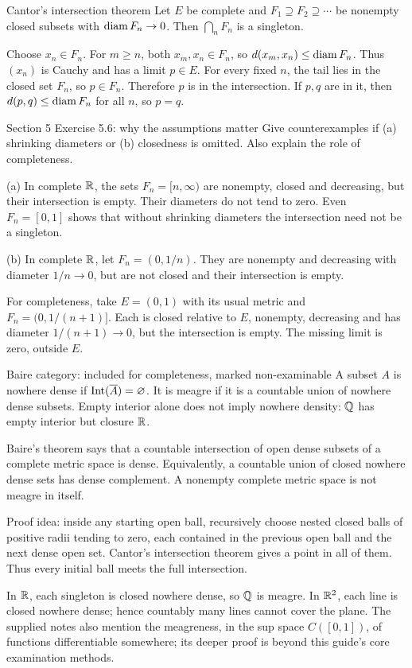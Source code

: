 \begin{note}{Cantor's intersection theorem}
Let $E$ be complete and $F_1\supseteq F_2\supseteq\cdots$ be nonempty closed subsets with $\operatorname{diam} F_n\to0$. Then $\bigcap_nF_n$ is a singleton.

Choose $x_n\in F_n$. For $m\ge n$, both $x_m,x_n\in F_n$, so $d(x_m,x_n)\le\operatorname{diam} F_n$. Thus $(x_n)$ is Cauchy and has a limit $p\in E$. For every fixed $n$, the tail lies in the closed set $F_n$, so $p\in F_n$. Therefore $p$ is in the intersection. If $p,q$ are in it, then $d(p,q)\le\operatorname{diam} F_n$ for all $n$, so $p=q$.
\end{note}
\begin{exam}{Section 5 Exercise 5.6: why the assumptions matter}
Give counterexamples if (a) shrinking diameters or (b) closedness is omitted. Also explain the role of completeness.
\end{exam}
\begin{answer}
(a) In complete $\mathbb R$, the sets $F_n=[n,\infty)$ are nonempty, closed and decreasing, but their intersection is empty. Their diameters do not tend to zero. Even $F_n=[0,1]$ shows that without shrinking diameters the intersection need not be a singleton.

(b) In complete $\mathbb R$, let $F_n=(0,1/n)$. They are nonempty and decreasing with diameter $1/n\to0$, but are not closed and their intersection is empty.

For completeness, take $E=(0,1)$ with its usual metric and $F_n=(0,1/(n+1)]$. Each is closed relative to $E$, nonempty, decreasing and has diameter $1/(n+1)\to0$, but the intersection is empty. The missing limit is zero, outside $E$.
\end{answer}
\begin{note}{Baire category: included for completeness, marked non-examinable}
A subset $A$ is nowhere dense if $\operatorname{Int}(\overline{A})=\varnothing$. It is meagre if it is a countable union of nowhere dense subsets. Empty interior alone does not imply nowhere density: $\mathbb Q$ has empty interior but closure $\mathbb R$.

Baire's theorem says that a countable intersection of open dense subsets of a complete metric space is dense. Equivalently, a countable union of closed nowhere dense sets has dense complement. A nonempty complete metric space is not meagre in itself.

Proof idea: inside any starting open ball, recursively choose nested closed balls of positive radii tending to zero, each contained in the previous open ball and the next dense open set. Cantor's intersection theorem gives a point in all of them. Thus every initial ball meets the full intersection.

In $\mathbb R$, each singleton is closed nowhere dense, so $\mathbb Q$ is meagre. In $\mathbb R^2$, each line is closed nowhere dense; hence countably many lines cannot cover the plane. The supplied notes also mention the meagreness, in the sup space $C([0,1])$, of functions differentiable somewhere; its deeper proof is beyond this guide's core examination methods.
\end{note}
